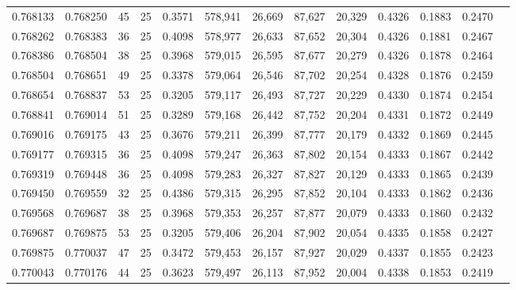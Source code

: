 \begin{tabular}{rrrrrrrrrrrrr}
0.768133 & 0.768250 &    45 &  25 &                                     0.3571 & 578,941 &  26,669 &  87,627 &  20,329 & 0.4326 & 0.1883 & 0.2470 \\
0.768262 & 0.768383 &    36 &  25 &                                     0.4098 & 578,977 &  26,633 &  87,652 &  20,304 & 0.4326 & 0.1881 & 0.2467 \\
0.768386 & 0.768504 &    38 &  25 &                                     0.3968 & 579,015 &  26,595 &  87,677 &  20,279 & 0.4326 & 0.1878 & 0.2464 \\
0.768504 & 0.768651 &    49 &  25 &                                     0.3378 & 579,064 &  26,546 &  87,702 &  20,254 & 0.4328 & 0.1876 & 0.2459 \\
0.768654 & 0.768837 &    53 &  25 &                                     0.3205 & 579,117 &  26,493 &  87,727 &  20,229 & 0.4330 & 0.1874 & 0.2454 \\
0.768841 & 0.769014 &    51 &  25 &                                     0.3289 & 579,168 &  26,442 &  87,752 &  20,204 & 0.4331 & 0.1872 & 0.2449 \\
0.769016 & 0.769175 &    43 &  25 &                                     0.3676 & 579,211 &  26,399 &  87,777 &  20,179 & 0.4332 & 0.1869 & 0.2445 \\
0.769177 & 0.769315 &    36 &  25 &                                     0.4098 & 579,247 &  26,363 &  87,802 &  20,154 & 0.4333 & 0.1867 & 0.2442 \\
0.769319 & 0.769448 &    36 &  25 &                                     0.4098 & 579,283 &  26,327 &  87,827 &  20,129 & 0.4333 & 0.1865 & 0.2439 \\
0.769450 & 0.769559 &    32 &  25 &                                     0.4386 & 579,315 &  26,295 &  87,852 &  20,104 & 0.4333 & 0.1862 & 0.2436 \\
0.769568 & 0.769687 &    38 &  25 &                                     0.3968 & 579,353 &  26,257 &  87,877 &  20,079 & 0.4333 & 0.1860 & 0.2432 \\
0.769687 & 0.769875 &    53 &  25 &                                     0.3205 & 579,406 &  26,204 &  87,902 &  20,054 & 0.4335 & 0.1858 & 0.2427 \\
0.769875 & 0.770037 &    47 &  25 &                                     0.3472 & 579,453 &  26,157 &  87,927 &  20,029 & 0.4337 & 0.1855 & 0.2423 \\
0.770043 & 0.770176 &    44 &  25 &                                     0.3623 & 579,497 &  26,113 &  87,952 &  20,004 & 0.4338 & 0.1853 & 0.2419 \\

\end{tabular}
